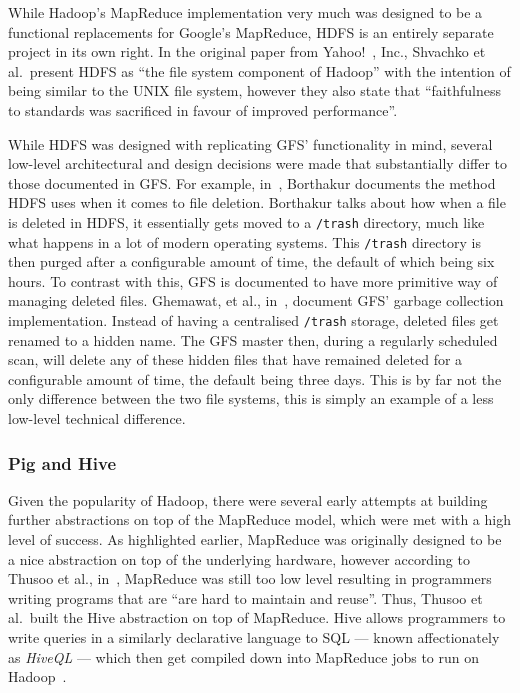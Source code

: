 \documentclass[a4paper,11pt]{article}
\begin{document}
While Hadoop's MapReduce implementation very much was designed to be a functional replacements for Google's MapReduce,
HDFS is an entirely separate project in its own right. In the original paper from Yahoo!~\cite{shvachko2010hadoop},
Inc., Shvachko et al.\ present HDFS as ``the file system component of Hadoop'' with the intention of being similar to
the UNIX file system, however they also state that ``faithfulness to standards was sacrificed in favour of improved
performance''.

While HDFS was designed with replicating GFS' functionality in mind, several low-level architectural and design decisions
were made that substantially differ to those documented in GFS. For example, in~\cite{borthakur2007hadoop}, Borthakur
documents the method HDFS uses when it comes to file deletion. Borthakur talks about how when a file is deleted in HDFS,
it essentially gets moved to a \texttt{/trash} directory, much like what happens in a lot of modern operating systems.
This \texttt{/trash} directory is then purged after a configurable amount of time, the default of which being six hours.
To contrast with this, GFS is documented to have more primitive way of managing deleted files. Ghemawat, et al.,
in~\cite{ghemawat_google_2003}, document GFS' garbage collection implementation. Instead of having a centralised
\texttt{/trash} storage, deleted files get renamed to a hidden name. The GFS master then, during a regularly scheduled
scan, will delete any of these hidden files that have remained deleted for a configurable amount of time, the default
being three days. This is by far not the only difference between the two file systems, this is simply an example of a
less low-level technical difference.



\subsubsection{Pig and Hive} %
\label{ssub:pig_and_hive}

Given the popularity of Hadoop, there were several early attempts at building further abstractions on top of the
MapReduce model, which were met with a high level of success. As highlighted earlier, MapReduce was originally designed
to be a nice abstraction on top of the underlying hardware, however according to Thusoo et al., in~\cite{thusoo2009hive},
MapReduce was still too low level resulting in programmers writing programs that are ``are hard to maintain and reuse''.
Thus, Thusoo et al.\ built the Hive abstraction on top of MapReduce. Hive allows programmers to write queries in a
similarly declarative language to SQL --- known affectionately as \emph{HiveQL} --- which then get compiled down into
MapReduce jobs to run on Hadoop~\cite{thusoo2010hive}.
\end{document}
